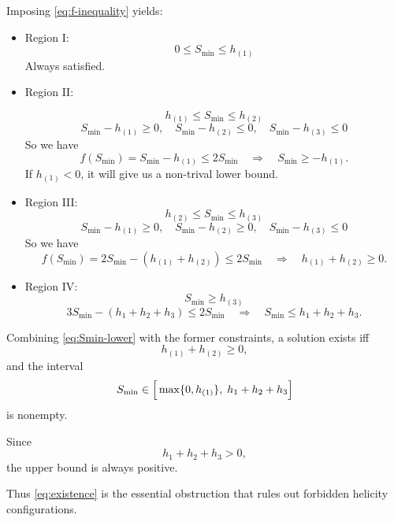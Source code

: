 \documentclass[12pt]{article}
\begin{document}
Imposing \eqref{eq:f-inequality} yields:
\begin{itemize}
\item Region I: $$0\le S_{\min}\le h_{(1)}$$  
  Always satisfied.

\item Region II: 
   
      $$h_{(1)}\le S_{\min}\le h_{(2)}$$
   \begin{equation}
      S_{\min}-h_{(1)}\ge 0,\quad S_{\min}-h_{(2)}\le0,\quad S_{\min}-h_{(3)}\le0
   \end{equation}
   So we have
   \begin{equation}
      f(S_{\min})=S_{\min}-h_{(1)}\le 2 S_{\min}
      \quad\Rightarrow\quad
      S_{\min}\ge -h_{(1)}.
   \end{equation}
  If $h_{(1)}<0$, it will give us a non-trival lower bound.

\item Region III: $$h_{(2)}\le S_{\min}\le h_{(3)}$$  
   \begin{equation}
      S_{\min}-h_{(1)}\ge 0,\quad S_{\min}-h_{(2)}\ge0,\quad S_{\min}-h_{(3)}\le0
   \end{equation}
   So we have 
   \begin{equation}
      f(S_{\min})=2S_{\min} - (h_{(1)}+h_{(2)}) \le 2 S_{\min}
      \quad\Rightarrow\quad
      h_{(1)}+h_{(2)}\ge 0.
   \end{equation}

\item Region IV: $$S_{\min}\ge h_{(3)}$$  
  \begin{equation}
  3 S_{\min}-(h_1+h_2+h_3)\le 2 S_{\min}
  \quad\Rightarrow\quad
  S_{\min}\le h_1+h_2+h_3.
  \end{equation}
\end{itemize}

Combining \eqref{eq:Smin-lower} with the former constraints, a solution exists iff
\begin{equation}\label{eq:existence}
h_{(1)} + h_{(2)} \ge 0,
\end{equation}
and the interval
\begin{equation}
S_{\min} \in 
\Bigl[\,
\max\{0,h_{(1)}\},
\;h_1+h_2+h_3
\Bigr]
\end{equation}
is nonempty.

Since $$h_1+h_2+h_3>0,$$ the upper bound is always positive.

Thus \eqref{eq:existence} is the essential obstruction that rules out forbidden helicity configurations.
\end{document}

